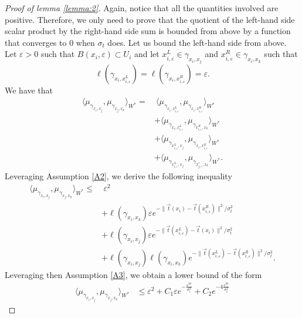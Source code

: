 \documentclass[pdflatex,sn-mathphys-num]{sn-jnl}%
\theoremstyle{thmstyleone}%
\theoremstyle{thmstyletwo}%
\theoremstyle{thmstylethree}%
\begin{document}
\begin{appendices}
\begin{proof}[Proof of lemma \ref{lemma:2}]
Again, notice that all the quantities involved are positive. Therefore, we only need to prove that the quotient of the left-hand side scalar product by the right-hand side sum is bounded from above by a function that converges to $0$ when $\sigma_t$ does. 
\medbreak    
Let us bound the left-hand side from above. Let $\varepsilon > 0$ such that $B(x_i, \varepsilon) \subset U_i$ and let $x_{i, \varepsilon}^L \in \gamma_{x_i, x_j}$ and $x_{i, \varepsilon}^R \in \gamma_{x_i, x_k}$ such that
\begin{equation*}
    \ell(\gamma_{x_i, x_{i, \varepsilon}^L})=\ell(\gamma_{x_i, x_{i, \varepsilon}^R}) = \varepsilon.
\end{equation*} 
We have that
\begin{align*}
    \langle \mu_{\gamma_{x_i, x_j}}, \mu_{\gamma_{x_j, x_k}} \rangle_{W^\ast} 
    = &\: \langle \mu_{\gamma_{x_i, x_{i, \varepsilon}^L}} , \mu_{\gamma_{x_i, x_{i, \varepsilon}^R}} \rangle_{W^\ast} \\
    &+ \langle \mu_{\gamma_{x_i, x_{i, \varepsilon}^L}} , \mu_{\gamma_{x_{i, \varepsilon}^R, x_k}} \rangle_{W^\ast} \\
    &+ \langle \mu_{\gamma_{x_{i, \varepsilon}^L, x_j}}, \mu_{\gamma_{x_i, x_{i, \varepsilon}^R}} \rangle_{W^\ast} \\
    &+ \langle \mu_{\gamma_{x_{i, \varepsilon}^L, x_j}}, \mu_{\gamma_{x_{j, \varepsilon}^r, x_k}} \rangle_{W^\ast}.
\end{align*}
Leveraging Assumption \ref{A2}, we derive the following inequality
\begin{align*}
    \langle \mu_{\gamma_{x_i, x_j}}, \mu_{\gamma_{x_j, x_k}} \rangle_{W^\ast} 
    \leq &\: \varepsilon^2 \\
    &+ \ell(\gamma_{x_i, x_k}) \varepsilon e^{-\|\vec{t}(x_i) - \vec{t}(x_{i, \varepsilon}^R)\|^2 / \sigma_t^2} \\
    &+ \ell(\gamma_{x_i, x_j}) \varepsilon e^{-\|\vec{t}(x_{i, \varepsilon}^L) - \vec{t}(x_i)\|^2 / \sigma_t^2} \\
    &+ \ell(\gamma_{x_i, x_j}) \ell(\gamma_{x_i, x_k}) e^{-\|\vec{t}(x_{i, \varepsilon}^L) - \vec{t}(x_{i, \varepsilon}^R)\|^2 / \sigma_t^2}.
\end{align*}
Leveraging then Assumption \ref{A3}, we obtain a lower bound of the form
\begin{align*}
    \langle \mu_{\gamma_{x_i, x_j}}, \mu_{\gamma_{x_j, x_k}} \rangle_{W^\ast} 
    &\leq \varepsilon^2 + C_1\varepsilon e^{-\frac{\varepsilon^{2a}}{\sigma_t^2}} + C_2e^{-4\frac{\varepsilon^{2a}}{\sigma_t^2}}

\end{align*}
\end{proof}
\end{appendices}
\end{document}

